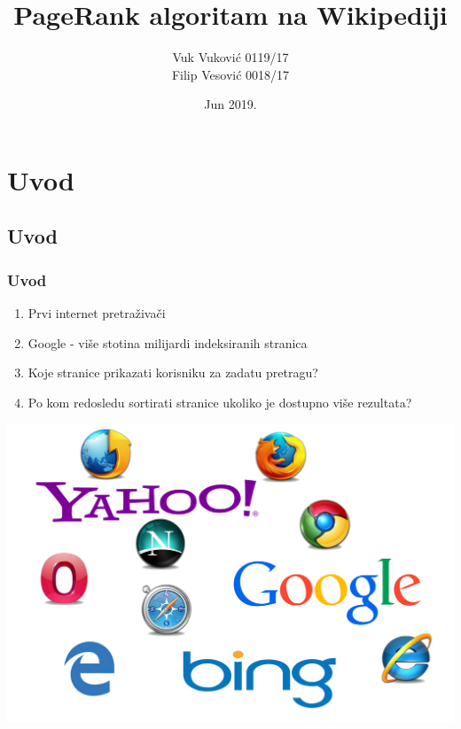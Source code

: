 \documentclass[11pt]{beamer}
\title{PageRank algoritam na Wikipediji}
\author[\textcolor{lgry}{Vuk Vuković 0119/17\\ Filip Vesović 0018/17}]{Vuk Vuković 0119/17\\ Filip Vesović 0018/17}
\date{Jun 2019.}
\institute{\textcolor{uorange}{\scshape Verovatnoća i statistika (13S082VS)}\\
Elektrotehnički fakultet,\\
Univerzitet u Beogradu}
\begin{document}
{
    \begin{frame}
        \titlepage

    \end{frame}
}

\section{Uvod}
\subsection{Uvod}

\begin{frame}
    \frametitle{Uvod}
  		\begin{center}
        \begin{enumerate}
                \item Prvi internet pretraživači
                \item Google - više stotina milijardi indeksiranih stranica
                \item Koje stranice prikazati korisniku za zadatu pretragu?
                \item Po kom redosledu sortirati stranice ukoliko je dostupno više rezultata?
            \end{enumerate}
            \includegraphics[width=0.4\columnwidth]{pretrazivaci.png}
        \end{center}
\end{frame}
\end{document}
